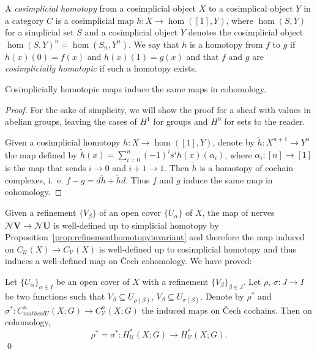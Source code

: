 \documentclass[a4paper,openany]{scrbook}
\newcommand{\nerve}{\mathcal N}
\begin{document}
\begin{defn}
A \emph{cosimplicial homotopy} from a cosimplicial object $X$ to a cosimplical object $Y$ in a category $C$ is a cosimplicial map $h\colon X \to \hom([1],Y)$, where $\hom(S,Y)$ for a simplicial set $S$ and a cosimplicial object $Y$ denotes the cosimplicial object $\hom(S,Y)^n = \hom(S_n,Y^n)$. We say that $h$ is a homotopy from $f$ to $g$ if $h(x)(0)=f(x)$ and $h(x)(1)=g(x)$ and that $f$ and $g$ are \emph{cosimplicially homotopic} if such a homotopy exists.
\end{defn}

\begin{lemma}\label{lemma:cosimphomotopicmaps}
Cosimplicially homotopic maps induce the same maps in cohomology.
\end{lemma}
\begin{proof}
For the sake of simplicity, we will show the proof for a sheaf with values in abelian groups, leaving the cases of $H^1$ for groups and $H^0$ for sets to the reader.

Given a cosimplicial homotopy $h\colon X \to \hom([1],Y)$, denote by $\tilde h\colon X^{n+1} \to Y^n$ the map defined by $\tilde h(x) = \sum_{i=0}^n (-1)^i s^i h(x)(\alpha_i)$, where $\alpha_i\colon [n]\to[1]$ is the map that sends $i \to 0$ and $i+1 \to 1$. Then $\tilde h$ is a homotopy of cochain complexes, i.~e. $f-g = d\tilde h + \tilde h d$.  Thus $f$ and $g$ induce the same map in cohomology.
\end{proof}

Given a refinement $\{V_\beta\}$ of an open cover $\{U_\alpha\}$ of $X$, the map of nerves $\nerve \mathbf V \to \nerve \mathbf U$ is well-defined up to simplicial homotopy by Proposition~\ref{prop:refinementhomotopyinvariant} and therefore the map induced on $C_{\mathcal U}(X) \to C_{\mathcal V}(X)$ is well-defined up to cosimplicial homotopy and thus induces a well-defined map on Čech cohomology. We have proved:

\begin{thm}\label{thm:welldefinedrefinement}
Let $\{U_\alpha\}_{\alpha \in I}$ be an open cover of $X$ with a refinement $\{V_\beta\}_{\beta \in J}$. Let $\rho$, $\sigma\colon J \to I$ be two functions such that $V_{\beta} \subseteq U_{\rho(\beta)}$, $V_\beta \subseteq U_{\sigma(\beta)}$. Denote by $\rho^*$ and $\sigma^*\colon C^n_{mathcal U}(X;G) \to C^n_{\mathcal V}(X;G)$ the induced maps on Čech cochains. Then on cohomology,
\[
\rho^* = \sigma^*\colon H^*_{\mathcal U}(X;G) \to H^*_{\mathcal V}(X;G).
\]\qed
\end{thm}
\end{document}
